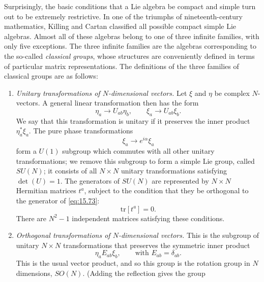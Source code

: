 Surprisingly, the basic conditions that a Lie algebra be compact and simple
turn out to be extremely restrictive.  In one of the triumphs of
nineteenth-century mathematics, Killing and Cartan classified all possible
compact simple Lie algebras.  Almost all of these algebras belong to one of
three infinite families, with only five exceptions.  The three infinite
families are the algebras corresponding to the so-called \emph{classical
groups}, whose structures are conveniently defined in terms of particular
matrix representations.  The definitions of the three families of classical
groups are as follows:
\begin{enumerate}
  \item \emph{Unitary transformations of $N$-dimensional vectors.}  Let
    $\xi$ and $\eta$ be complex $N$-vectors.  A general linear transformation
    then has the form
    \begin{equation}
      \eta_a \to U_{ab}\eta_b,\qquad \xi_a \to U_{ab}\xi_b .
      \label{eq:15.72}
    \end{equation}
    We say that this transformation is unitary if it preserves the inner
    product $\eta^{*}_a\xi_a$.  The pure phase transformations
    \begin{equation}
      \xi_a \to e^{i\alpha}\xi_a
      \label{eq:15.73}
    \end{equation}
    form a $U(1)$ subgroup which commutes with all other unitary
    transformations; we remove this subgroup to form a simple Lie group,
    called $SU(N)$; it consists of all $N\times N$ unitary transformations
    satisfying $\det(U) = 1$.  The generators of $SU(N)$ are represented by
    $N\times N$ Hermitian matrices $t^a$, subject to the condition that they
    be orthogonal to the generator of \eqref{eq:15.73}:
    \begin{equation}
      \mathrm{tr}[t^a] = 0 .
      \label{eq:15.74}
    \end{equation}
    There are $N^2-1$ independent matrices satisfying these conditions.
  \item \emph{Orthogonal transformations of $N$-dimensional vectors.}  This
    is the subgroup of unitary $N\times N$ transformations that preserves
    the symmetric inner product
    \begin{equation}
      \eta_a E_{ab}\xi_b,
      \qquad\text{with } E_{ab} = \delta_{ab} .
      \label{eq:15.75}
    \end{equation}
    This is the usual vector product, and so this group is the rotation group
    in $N$ dimensions, $SO(N)$.  (Adding the reflection gives the group

\end{enumerate}
